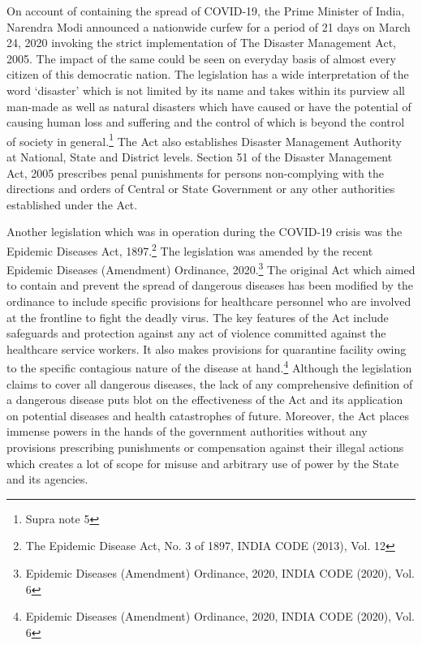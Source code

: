 \begin{multicols}{2}
\noi
On account of containing the spread of COVID-19, the Prime Minister of India, Narendra
Modi announced a nationwide curfew for a period of 21 days on March 24, 2020 invoking
the strict implementation of The Disaster Management Act, 2005. The impact of the same
could be seen on everyday basis of almost every citizen of this democratic nation. The
legislation has a wide interpretation of the word ‘disaster’ which is not limited by its name and takes within its purview all man-made as well as natural disasters which have caused or
have the potential of causing human loss and suffering and the control of which is beyond the
control of society in general.\footnote{Supra note 5} The Act also establishes Disaster Management Authority at
National, State and District levels. Section 51 of the Disaster Management Act, 2005
prescribes penal punishments for persons non-complying with the directions and orders of
Central or State Government or any other authorities established under the Act.

\noi
Another legislation which was in operation during the COVID-19 crisis was the Epidemic
Diseases Act, 1897.\footnote{The Epidemic Disease Act, No. 3 of 1897, INDIA CODE (2013), Vol. 12} The legislation was amended by the recent Epidemic Diseases
(Amendment) Ordinance, 2020.\footnote{Epidemic Diseases (Amendment) Ordinance, 2020, INDIA CODE (2020), Vol. 6} The original Act which aimed to contain and prevent the
spread of dangerous diseases has been modified by the ordinance to include specific
provisions for healthcare personnel who are involved at the frontline to fight the deadly virus.
The key features of the Act include safeguards and protection against any act of violence
committed against the healthcare service workers. It also makes provisions for quarantine
facility owing to the specific contagious nature of the disease at hand.\footnote{Epidemic Diseases (Amendment) Ordinance, 2020, INDIA CODE (2020), Vol. 6} Although the
legislation claims to cover all dangerous diseases, the lack of any comprehensive definition of
a dangerous disease puts blot on the effectiveness of the Act and its application on potential
diseases and health catastrophes of future. Moreover, the Act places immense powers in the
hands of the government authorities without any provisions prescribing punishments or
compensation against their illegal actions which creates a lot of scope for misuse and
arbitrary use of power by the State and its agencies. 


\end{multicols}
